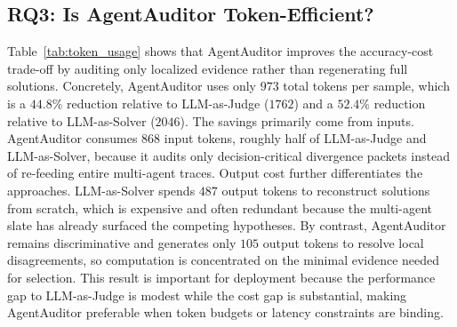 \documentclass{article}
\theoremstyle{plain}
\theoremstyle{definition}
\theoremstyle{remark}
\begin{document}



\subsection{RQ3: Is AgentAuditor Token-Efficient?}
\label{sec:rq3}

Table~\ref{tab:token_usage} shows that AgentAuditor improves the accuracy-cost trade-off by auditing only localized evidence rather than regenerating full solutions. Concretely, AgentAuditor uses only $973$ total tokens per sample, which is a $44.8\%$ reduction relative to LLM-as-Judge ($1762$) and a $52.4\%$ reduction relative to LLM-as-Solver ($2046$). The savings primarily come from inputs. AgentAuditor consumes $868$ input tokens, roughly half of LLM-as-Judge and LLM-as-Solver, because it audits only decision-critical divergence packets instead of re-feeding entire multi-agent traces. Output cost further differentiates the approaches. LLM-as-Solver spends $487$ output tokens to reconstruct solutions from scratch, which is expensive and often redundant because the multi-agent slate has already surfaced the competing hypotheses. By contrast, AgentAuditor remains discriminative and generates only $105$ output tokens to resolve local disagreements, so computation is concentrated on the minimal evidence needed for selection. This result is important for deployment because the performance gap to LLM-as-Judge is modest while the cost gap is substantial, making AgentAuditor preferable when token budgets or latency constraints are binding.
\end{document}
